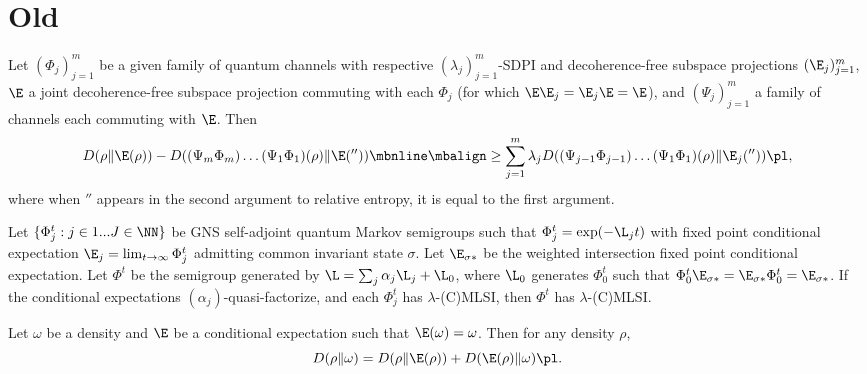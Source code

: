 
\section{Old}

\begin{lemma} \label{lem:chainmin1}
Let $(\Phi_j)_{j=1}^m$ be a given family of quantum channels with respective $(\lambda_j)_{j=1}^m$-SDPI and decoherence-free subspace projections $(\E_j)_{j=1}^m$, $\E$ a joint decoherence-free subspace projection commuting with each $\Phi_j$ (for which $\E \E_j = \E_j \E = \E$),
and $(\Psi_j)_{j=1}^m$ a family of channels each commuting with $\E$. Then
\begin{equation*}
    \begin{split}
         D(\rho \| \E(\rho)) - D((\Psi_m \Phi_m) \dots (\Psi_1 \Phi_1) (\rho) \| \E (''))
            \mbnline \mbalign \geq \sum_{j=1}^m \lambda_j D( (\Psi_{j-1} \Phi_{j-1}) \dots (\Psi_1 \Phi_1)(\rho) \| \E_j ('')) \pl,
    \end{split}
\end{equation*}
where when $''$ appears in the second argument to relative entropy, it is equal to the first argument.
\end{lemma}
\begin{prop} \label{prop:decay-merge}
Let $\{\Phi^t_j : j \in 1...J \in \NN\}$ be GNS self-adjoint quantum Markov semigroups such that $\Phi_j^t = \exp(- \L_j t)$ with fixed point conditional expectation $\E_{j} = \lim_{t \rightarrow \infty} \Phi_j^t$ admitting common invariant state $\sigma$. Let $\E_{\sigma *}$ be the weighted intersection fixed point conditional expectation. Let $\Phi^t$ be the semigroup generated by $\L = \sum_j \alpha_j \L_j + \L_0$, where $\L_0$ generates $\Phi_0^t$ such that $\Phi_0^t \E_{\sigma *} = \E_{\sigma *} \Phi_0^t = \E_{\sigma *}$. If the conditional expectations $(\alpha_j)$-quasi-factorize, and each $\Phi^t_j$ has $\lambda$-(C)MLSI, then $\Phi^t$ has $\lambda$-(C)MLSI.
\end{prop}
\begin{lemma} \label{lem:chainexp}
Let $\omega$ be a density and $\E$ be a conditional expectation such that $\E(\omega) = \omega$. Then for any density $\rho$,
\begin{equation*}
D(\rho \| \omega) = D(\rho \| \E(\rho)) + D(\E(\rho) \| \omega) \pl.
\end{equation*}
\end{lemma}

